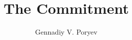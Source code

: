 \documentclass[a4paper,12pt,twoside]{book}
\begin{document}
%
%
\pagestyle{empty}
\title{\textbf{The Commitment}}
\author{
Gennadiy V. Poryev
}
\date{}
\maketitle
%
%
\pagestyle{fancy}
\fancyhf{}
\lhead[]{\thepage}
\rhead[\thepage]{}
\linespread{1.2}
%
%

%
%
\newpage
\renewcommand{\cftchapdotsep}{\cftdotsep}
\tableofcontents
\newpage
\thispagestyle{empty}
%
%

%

%

%

%
%
%
%
\end{document}
